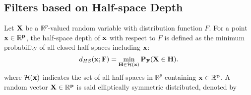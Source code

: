 \documentclass[a4paper,12pt]{article}
\begin{document}
\subsection{Filters based on Half-space Depth}
Let $\bf{X}$ be a $\mathbb{R}^p$-valued random variable with distribution function $F$. For a point $\bf{x} \in \mathbb{R}^p$, the half-space depth of $\bf{x}$ with respect to $F$ is defined as the minimum probability of all closed half-spaces including $\bf{x}$:
\begin{equation*}
d_{HS} (\bf{x};F) = \min_{H \in \mathcal{H}(\bf{x})} P_F(\bf{X} \in H).
\end{equation*}
where $\mathcal{H}(\bf{x})$ indicates the set of all half-spaces in $\mathbb{R}^p$ containing $\bf{x} \in \mathbb{R}^p$.
A random vector $\bf{X} \in \mathbb{R}^p$ is said elliptically symmetric distributed, denoted by
\end{document}
